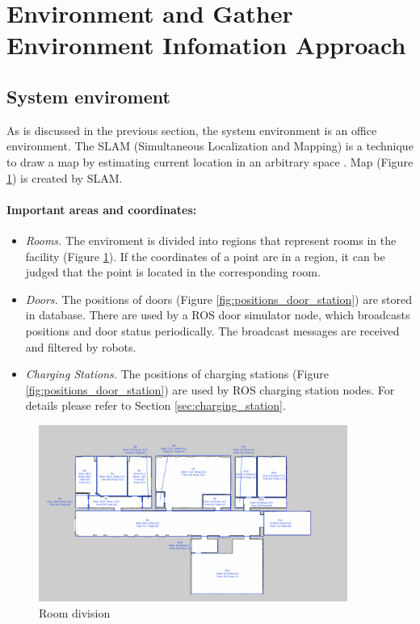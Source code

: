 \section{Environment and Gather Environment Infomation Approach}
\subsection{System enviroment}
\label{sec:system_enviroment}
As is discussed in the previous section, the system environment is an office environment. The SLAM (Simultaneous Localization and Mapping) is a technique to draw a map by estimating current location in an arbitrary space \cite{slam}. Map (Figure \ref{fig:room_division}) is created by SLAM.

\paragraph{Important areas and coordinates:}
\begin{itemize}
	\item \textsl{Rooms.} The enviroment is divided into regions that represent rooms in the facility (Figure \ref{fig:room_division}). If the coordinates of a point are in a region, it can be judged that the point is located in the corresponding room.
	\item \textsl{Doors.} The positions of doors (Figure \ref{fig:positions_door_station}) are stored in database. There are used by a ROS door simulator node, which broadcasts positions and door status periodically. The broadcast messages are received and filtered by robots.
	\item \textsl{Charging Stations.} The positions of charging stations (Figure \ref{fig:positions_door_station}) are used by ROS charging station nodes. For details please refer to Section \ref{sec:charging_station}.
\end{itemize}

\begin{figure}[htbp]
	\centering
	\includegraphics[width = 0.9\textwidth]{content/images/ch3/room_division.png}
	\caption{Room division}
	\label{fig:room_division}
\end{figure}

